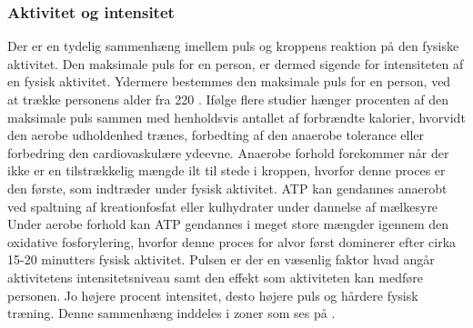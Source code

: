 \subsubsection{Aktivitet og intensitet}\label{subsub:ak_int}
Der er en tydelig sammenhæng imellem puls og kroppens reaktion på den fysiske aktivitet. Den maksimale puls for en person, er dermed sigende for intensiteten af en fysisk aktivitet. Ydermere bestemmes den maksimale puls for en person, ved at trække personens alder fra 220 \citep{CooperBlair2005}.\newline
Ifølge flere studier hænger procenten af den maksimale puls sammen med henholdsvis antallet af forbrændte kalorier, hvorvidt den aerobe udholdenhed trænes, forbedting af den anaerobe tolerance eller forbedring den cardiovaskulære ydeevne. Anaerobe forhold forekommer når der ikke er en tilstrækkelig mængde ilt til stede i kroppen, hvorfor denne proces er den første, som indtræder under fysisk aktivitet. ATP kan gendannes anaerobt ved spaltning af kreationfosfat eller kulhydrater under dannelse af mælkesyre \citep{Martini2012,Engelbreth2010} Under aerobe forhold kan ATP gendannes i meget store mængder igennem den oxidative fosforylering, hvorfor denne proces for alvor først dominerer efter cirka 15-20 minutters fysisk aktivitet. \citep{Martini2012,Engelbreth2010} \newline
Pulsen er der en væsenlig faktor hvad angår aktivitetens intensitetsniveau samt den effekt som aktiviteten kan medføre personen. Jo højere procent intensitet, desto højere puls og hårdere fysisk træning. Denne sammenhæng inddeles i zoner som ses på . \citep{Leyland2007,Heartratejournal2015}
